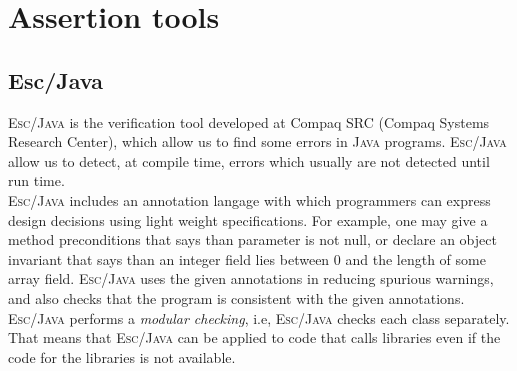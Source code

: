\section{Assertion tools}


\subsection{\sc Esc/Java}
\textsc{Esc/Java} is the verification tool developed at
Compaq SRC (Compaq Systems Research Center), which allow us to find
some errors in \textsc{Java} programs. \textsc{Esc/Java} allow us to
detect, at compile time, errors which usually are not detected until
run time. \\

\textsc{Esc/Java} includes an annotation langage with which
programmers can express design decisions using light weight
specifications. For example, one may give a method preconditions that
says than parameter is not null, or declare an object invariant that
says than an integer field lies between $0$ and the length of some
array field. \textsc{Esc/Java} uses the given annotations in reducing
spurious warnings, and also checks that the program is consistent with 
the given annotations. \\

\textsc{Esc/Java} performs a \textit{modular checking}, i.e,
\textsc{Esc/Java} checks each class separately. That means that
\textsc{Esc/Java} can be applied to code that calls libraries even if
the code for the libraries is not available. \\

